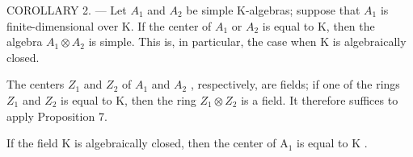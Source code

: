 COROLLARY 2. --- Let \(A_{1}\) and \(A_{2}\) be simple K-algebras; suppose that \(A_{1}\) is finite-dimensional over K. If the center of \(A_{1}\) or \(A_{2}\) is equal to K, then the algebra \(A_{1} \otimes A_{2}\) is simple. This is, in particular, the case when K is algebraically closed.

The centers \(Z_{1}\) and \(Z_{2}\) of \(A_{1}\) and \(A_{2}\) , respectively, are fields; if one of the rings \(Z_{1}\) and \(Z_{2}\) is equal to K, then the ring \(Z_{1} \otimes Z_{2}\) is a field. It therefore suffices to apply Proposition 7.

If the field \(\mathrm{K}\) is algebraically closed, then the center of \(\mathrm{A}_1\) is equal to \(\mathrm{K}\) .
